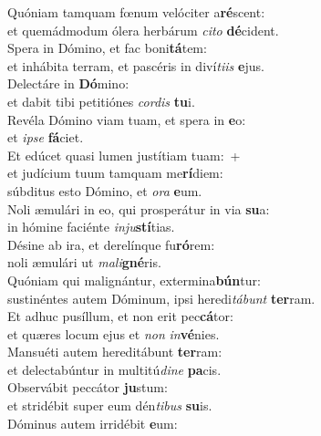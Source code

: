 \evenverse Quóniam tamquam fœnum velóciter a\textbf{ré}scent:~\*\\
\evenverse et quemádmodum ólera herbárum \textit{ci}\textit{to} \textbf{dé}cident.\\
\oddverse Spera in Dómino, et fac boni\textbf{tá}tem:~\*\\
\oddverse et inhábita terram, et pascéris in diví\textit{ti}\textit{is} \textbf{e}jus.\\
\evenverse Delectáre in \textbf{Dó}mino:~\*\\
\evenverse et dabit tibi petitiónes \textit{cor}\textit{dis} \textbf{tu}i.\\
\oddverse Revéla Dómino viam tuam, et spera in \textbf{e}o:~\*\\
\oddverse et \textit{i}\textit{pse} \textbf{fá}ciet.\\
\evenverse Et edúcet quasi lumen justítiam tuam:~+\\
\evenverse  et judícium tuum tamquam me\textbf{rí}diem:~\*\\
\evenverse súbditus esto Dómino, et \textit{o}\textit{ra} \textbf{e}um.\\
\oddverse Noli æmulári in eo, qui prosperátur in via \textbf{su}a:~\*\\
\oddverse in hómine faciénte \textit{in}\textit{ju}\textbf{stí}tias.\\
\evenverse Désine ab ira, et derelínque fu\textbf{ró}rem:~\*\\
\evenverse noli æmulári ut \textit{ma}\textit{li}\textbf{gné}ris.\\
\oddverse Quóniam qui malignántur, extermina\textbf{bún}tur:~\*\\
\oddverse sustinéntes autem Dóminum, ipsi heredi\textit{tá}\textit{bunt} \textbf{ter}ram.\\
\evenverse Et adhuc pusíllum, et non erit pec\textbf{cá}tor:~\*\\
\evenverse et quæres locum ejus et \textit{non} \textit{in}\textbf{vé}nies.\\
\oddverse Mansuéti autem hereditábunt \textbf{ter}ram:~\*\\
\oddverse et delectabúntur in multitú\textit{di}\textit{ne} \textbf{pa}cis.\\
\evenverse Observábit peccátor \textbf{ju}stum:~\*\\
\evenverse et stridébit super eum dén\textit{ti}\textit{bus} \textbf{su}is.\\
\oddverse Dóminus autem irridébit \textbf{e}um:~\*\\
